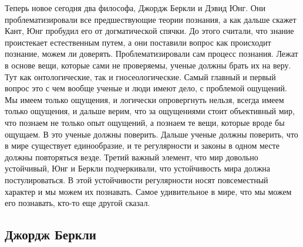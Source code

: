 \documentclass[a4paper, 12pt]{article}
\begin{document}
Теперь новое сегодня два философа, Джордж Беркли и Дэвид Юнг. Они 
проблематизировали все предшествующие теории познания, а как дальше 
скажет Кант, Юнг пробудил его от догматической спячки. До этого считали, 
что знание проистекает естественным путем, а они поставили вопрос как 
происходит познание, можем ли доверять. Проблематизировали сам процесс 
познания. Лежат в основе вещи, которые сами не проверяемы, ученые должны 
брать их на веру. Тут как онтологические, так и гносеологические. Самый 
главный и первый вопрос это с чем вообще ученые и люди имеют дело, 
с проблемой ощущений. Мы имеем только ощущения, и логически опровергнуть 
нельзя, всегда имеем только ощущения, и дальше верим, что за ощущениями 
стоит объективный мир, что познаем не только опыт ощущений, а познаем те 
вещи, которые вроде бы ощущаем. В это ученые должны поверить. Дальше 
ученые должны поверить, что в мире существует единообразие, и те 
регулярности и законы в одном месте должны повторяться везде. Третий 
важный элемент, что мир довольно устойчивый, Юнг и Беркли подчеркивали, 
что устойчивость мира должна постулироваться. В этой устойчивости 
регулярности носят повсеместный характер и мы можем их познавать. Самое 
удивительное в мире, что мы можем его познавать, кто-то еще другой 
сказал.

\subsection{Джордж Беркли}
\end{document}
